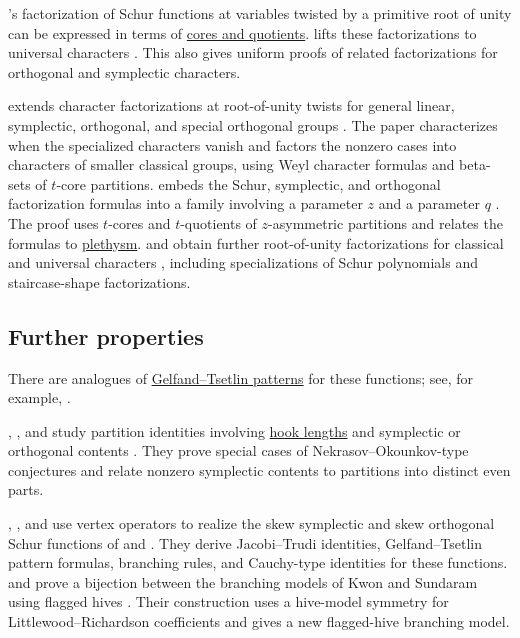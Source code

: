 's factorization of Schur functions at variables
twisted by a primitive root of unity can be expressed in terms of
\hyperref[partitionQuotient]{cores and quotients}.  
lifts these factorizations to universal characters
\cite{Albion2023}.  This also gives uniform proofs of related factorizations
for orthogonal and symplectic characters.

 extends character factorizations at root-of-unity twists
for general linear, symplectic, orthogonal, and special orthogonal groups
\cite{Kumari2024}.  The paper characterizes when the specialized characters
vanish and factors the nonzero cases into characters of smaller classical
groups, using Weyl character formulas and beta-sets of $t$-core partitions.
 embeds the Schur, symplectic, and orthogonal
factorization formulas into a family involving a parameter $z$ and a
parameter $q$ \cite{Albion2025x}.  The proof uses $t$-cores and $t$-quotients
of $z$-asymmetric partitions and relates the formulas to \hyperref[plethysm]{plethysm}.
 and  obtain further root-of-unity
factorizations for classical and universal characters
\cite{AyyerKumari2024x}, including specializations of Schur polynomials and
staircase-shape factorizations.


\subsection[schurSymplecticOtherProperties]{Further properties}

There are analogues of \hyperref[gtpatterns]{Gelfand--Tsetlin patterns} for
these functions; see, for example,
\cite{Proctor1994,AyyerFischer2019,JingLiWang2024}.

, , and
 study partition identities involving
\hyperref[partitionCores]{hook lengths}
and symplectic or orthogonal contents \cite{AmdeberhanAndrewsBallantine2023}.
They prove special cases of Nekrasov--Okounkov-type conjectures and relate
nonzero symplectic contents to partitions into distinct even parts.

, , and  use vertex
operators to realize the skew symplectic and skew orthogonal Schur functions
of  and  \cite{JingLiWang2024}.  They
derive Jacobi--Trudi identities, Gelfand--Tsetlin pattern formulas, branching
rules, and Cauchy-type identities for these functions.
 and  prove a
bijection between the branching models of Kwon and Sundaram using flagged
hives \cite{KumarTorres2024x}.  Their construction uses a hive-model symmetry
for Littlewood--Richardson coefficients and gives a new flagged-hive
branching model.

